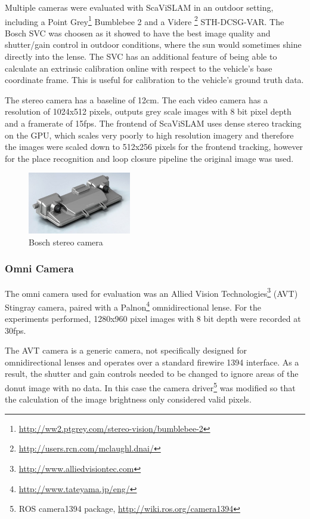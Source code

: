Multiple cameras were evaluated with ScaViSLAM in an outdoor setting, including a Point Grey\footnote{\url{http://ww2.ptgrey.com/stereo-vision/bumblebee-2}} Bumblebee 2 and a Videre \footnote{\url{http://users.rcn.com/mclaughl.dnai/}} STH-DCSG-VAR.  The Bosch SVC was choosen as it showed to have the best image quality and shutter/gain control in outdoor conditions, where the sun would sometimes shine directly into the lense.  The SVC has an additional feature of being able to calculate an extrinsic calibration online with respect to the vehicle's base coordinate frame.  This is useful for calibration to the vehicle's ground truth data.

The stereo camera has a baseline of 12cm.  The each video camera has a resolution of 1024x512 pixels, outputs grey scale images with 8 bit pixel depth and a framerate of 15fps.  The frontend of ScaViSLAM uses dense stereo tracking on the GPU, which scales very poorly to high resolution imagery and therefore the images were scaled down to 512x256 pixels for the frontend tracking, however for the place recognition and loop closure pipeline the original image was used.

\begin{figure}[h]
  \centering
    \includegraphics[width=0.4\textwidth]{chapters/images/svc}
  \caption{Bosch stereo camera}
  \label{fig:bosch_svc}
\end{figure}

\subsubsection{Omni Camera}

The omni camera used for evaluation was an Allied Vision Technologies\footnote{\url{http://www.alliedvisiontec.com}} (AVT) Stingray camera, paired with a Palnon\footnote{\url{http://www.tateyama.jp/eng/}} omnidirectional lense.  For the experiments performed, 1280x960 pixel images with 8 bit depth were recorded at 30fps.  

The AVT camera is a generic camera, not specifically designed for omnidirectional lenses and operates over a standard firewire 1394 interface.  As a result, the shutter and gain controls needed to be changed to ignore areas of the donut image with no data.  In this case the camera driver\footnote{ROS camera1394 package, \url{http://wiki.ros.org/camera1394}} was modified so that the calculation of the image brightness only considered valid pixels.

